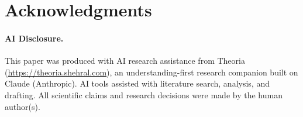 \documentclass[11pt,a4paper]{article}
\begin{document}

\section*{Acknowledgments}


\paragraph{AI Disclosure.}
This paper was produced with AI research assistance from Theoria (\url{https://theoria.shehral.com}), an understanding-first research companion built on Claude (Anthropic). AI tools assisted with literature search, analysis, and drafting. All scientific claims and research decisions were made by the human author(s).



\end{document}
